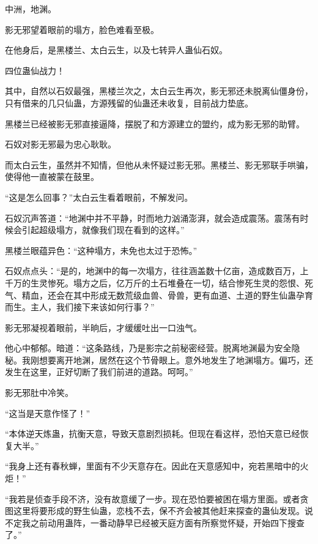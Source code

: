 
\begin{this_body}

中洲，地渊。

影无邪望着眼前的塌方，脸色难看至极。

在他身后，是黑楼兰、太白云生，以及七转异人蛊仙石奴。

四位蛊仙战力！

其中，自然以石奴最强，黑楼兰次之，太白云生再次，影无邪还未脱离仙僵身份，只有借来的几只仙蛊，方源残留的仙蛊还未收复，目前战力垫底。

黑楼兰已经被影无邪直接逼降，摆脱了和方源建立的盟约，成为影无邪的助臂。

石奴对影无邪最为忠心耿耿。

而太白云生，虽然并不知情，但他从未怀疑过影无邪。黑楼兰、影无邪联手哄骗，使得他一直被蒙在鼓里。

“这是怎么回事？”太白云生看着眼前，不解发问。

石奴沉声答道：“地渊中并不平静，时而地力汹涌澎湃，就会造成震荡。震荡有时候会引起超级塌方，就像我们现在看到的这样。”

黑楼兰眼蕴异色：“这种塌方，未免也太过于恐怖。”

石奴点点头：“是的，地渊中的每一次塌方，往往涵盖数十亿亩，造成数百万，上千万的生灵惨死。塌方之后，亿万斤的土石堆叠在一切，结合惨死生灵的怨恨、死气、精血，还会在其中形成无数荒级血兽、骨兽，更有血道、土道的野生仙蛊孕育而生。主人，我们接下来该如何行事？”

影无邪凝视着眼前，半晌后，才缓缓吐出一口浊气。

他心中郁郁。暗道：“这条路线，乃是影宗之前秘密经营。脱离地渊最为安全隐秘。我刚想要离开地渊，居然在这个节骨眼上。意外地发生了地渊塌方。偏巧，还发生在这里，正好切断了我们前进的道路。呵呵。”

影无邪肚中冷笑。

“这当是天意作怪了！”

“本体逆天炼蛊，抗衡天意，导致天意剧烈损耗。但现在看这样，恐怕天意已经恢复大半。”

“我身上还有春秋蝉，里面有不少天意存在。因此在天意感知中，宛若黑暗中的火炬！”

“我若是侦查手段不济，没有故意缓了一步。现在恐怕要被困在塌方里面。或者贪图这里将要形成的野生仙蛊，恋栈不去，保不齐会被其他赶来探查的蛊仙发现。说不定我之前动用蛊阵，一番动静早已经被天庭方面有所察觉怀疑，开始四下搜查了。”


\end{this_body}
